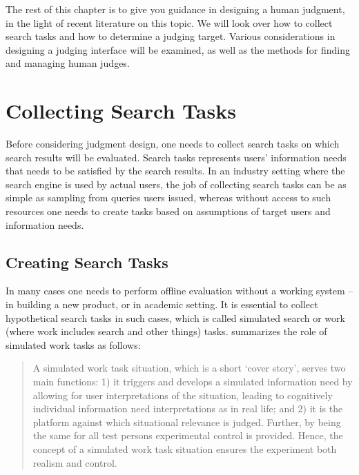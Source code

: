 \documentclass[openany]{now} %
\begin{document}
The rest of this chapter is to give you guidance in designing a human judgment, in the light of recent literature on this topic. We will look over how to collect search tasks and how to determine a judging target. Various considerations in designing a judging interface will be examined, as well as the methods for finding and managing human judges.



\section{Collecting Search Tasks}
Before considering judgment design, one needs to collect search tasks on which search results will be evaluated. Search tasks represents users' information needs that needs to be satisfied by the search results. In an industry setting where the search engine is used by actual users, the job of collecting search tasks can be as simple as sampling from queries users issued, whereas without access to such resources one needs to create tasks based on assumptions of target users and information needs. 

\subsection{Creating Search Tasks}
In many cases one needs to perform offline evaluation without a working system -- in building a new product, or in academic setting. It is essential to collect hypothetical search tasks in such cases, which is called simulated search or work (where work includes search and other things) tasks. \cite{Borlund:2003} summarizes the role of simulated work tasks as follows:


\begin{quote}
A simulated work task situation, which is a short `cover story', serves two main functions: 1) it triggers and develops a simulated information need by allowing for user interpretations of the situation, leading to cognitively individual information need interpretations as in real life; and 2) it is the platform against which situational relevance is judged. Further, by being the same for all test persons experimental control is provided. Hence, the concept of a simulated work task situation ensures the experiment both realism and control.	
\end{quote}
\end{document}
